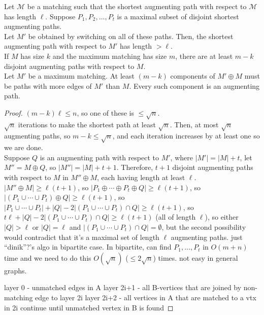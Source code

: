 



\begin{flem}
	Let $\mathcal{M}$ be a matching such that the shortest augmenting path with respect to $\mathcal{M}$ has length $\ell$. Suppose $P_1,P_2,\ldots,P_t$ is a maximal subset of disjoint shortest augmenting paths.\\

	Let $M'$ be obtained by switching on all of these paths. Then, the shortest augmenting path with respect to $M'$ has length $> \ell$.\\

	If $M$ has size $k$ and the maximum matching has size $m$, there are at least $m-k$ disjoint augmenting paths with respect to $M$.\\

	Let $M'$ be a maximum matching. At least $(m-k)$ components of $M' \oplus M$ must be paths with more edges of $M'$ than $M$. Every such component is an augmenting path.
\end{flem}
\begin{proof}
	$(m-k)\ell \le n$, so one of these is $\le \sqrt{n}$.\\
	$\sqrt{n}$ iterations to make the shortest path at least $\sqrt{n}$. Then, at most $\sqrt{n}$ augmenting paths, so $m-k \le \sqrt{n}$, and each iteration increases by at least one so we are done.\\
	Suppose $Q$ is an augmenting path with respect to $M'$, where $|M'| = |M| + t$, let $M'' = M \oplus Q$, so $|M''| = |M|+t+1$. Therefore, $t+1$ disjoint augmenting paths with respect to $M$ in $M'' \oplus M$, each having length at least $\ell$.\\
	$|M'' \oplus M| \ge \ell(t+1)$, so $|P_1 \oplus \cdots \oplus P_t \oplus Q| \ge \ell(t+1)$, so $|(P_1 \cup \cdots \cup P_t) \oplus Q| \ge \ell(t+1)$, so $|P_1 \cup \cdots \cup P_t| + |Q| - 2 |(P_1 \cup \cdots \cup P_t)\cap Q| \ge \ell(t+1)$, so $t\ell + |Q| - 2|(P_1 \cup \cdots \cup P_t) \cap Q| \ge \ell(t+1)$ (all of length $\ell$), so either $|Q| > \ell$ or $|Q| = \ell$ and $|(P_1 \cup \cdots \cup P_t) \cap Q| = \emptyset$, but the second possibility would contradict that it's a maximal set of length $\ell$ augmenting paths.
	just ``dinik''?'s algo in bipartite case. 
	In bipartite, can find $P_1,\ldots,P_t$ in $O(m+n)$ time and we need to do this $O(\sqrt{n})$ ($\le 2\sqrt{n}$) times. not easy in general graphs.

	layer 0 - unmatched edges in A
	layer 2i+1 - all B-vertices that are joined by non-matching edge to layer 2i
	layer 2i+2 - all vertices in A that are matched to a vtx in 2i
	continue until unmatched vertex in B is found
\end{proof}

